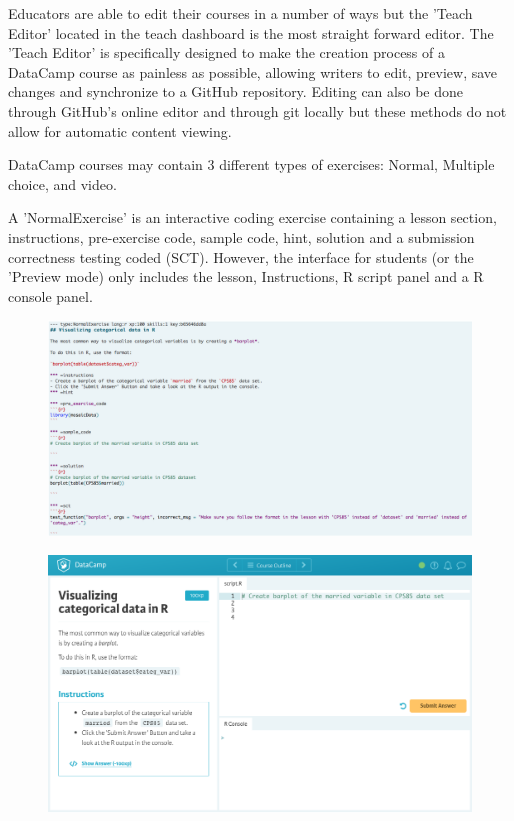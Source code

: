 \documentclass[12pt]{article}
\begin{document}
Educators are able to edit their courses in a number of ways but the 'Teach Editor' located in the teach dashboard is the
most straight forward editor. The 'Teach Editor' is specifically designed to make the creation process of a DataCamp course
as painless as possible, allowing writers to edit, preview, save changes and synchronize to a GitHub repository. Editing can
also be done through GitHub's online editor and through git locally but these methods do not allow for automatic content
viewing.



DataCamp courses may contain 3 different types of exercises: Normal, Multiple choice, and video.

A 'NormalExercise' is an interactive coding exercise containing a lesson section, instructions, pre-exercise code, sample
code, hint, solution and a submission correctness testing coded (SCT). However, the interface for students (or the 'Preview
mode) only includes the lesson, Instructions, R script panel and a R console panel.



\begin{figure}[h]
  \includegraphics[scale = 0.2] {edit.jpg}
\end{figure}


\begin{figure}[h]
  \includegraphics[scale = 0.19] {preview.jpg}
\end{figure}
\end{document}
